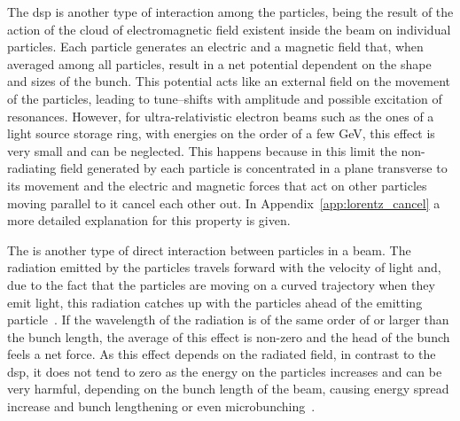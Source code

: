     The \gls{dsp} is another type of interaction among the particles, being the result of the action of the cloud of electromagnetic field existent inside the beam on individual particles. Each particle generates an electric and a magnetic field that, when averaged among all particles, result in a net potential dependent on the shape and sizes of the bunch. This potential acts like an external field on the movement of the particles, leading to tune--shifts with amplitude and possible excitation of resonances. However, for ultra-relativistic electron beams such as the ones of a light source storage ring, with energies on the order of a few \si{\giga\electronvolt}, this effect is very small and can be neglected. This happens because in this limit the non-radiating field generated by each particle is concentrated in a plane transverse to its movement and the electric and magnetic forces that act on other particles moving parallel to it cancel each other out. In Appendix~\ref{app:lorentz_cancel} a more detailed explanation for this property is given.

    The  is another type of direct interaction between particles in a beam. The radiation emitted by the particles travels forward with the velocity of light and, due to the fact that the particles are moving on a curved trajectory when they emit light, this radiation catches up with the particles ahead of the emitting particle~\cite{Derbenev1995}. If the wavelength of the radiation is of the same order of or larger than the bunch length, the average of this effect is non-zero and the head of the bunch feels a net force. As this effect depends on the radiated field, in contrast to the \gls{dsp}, it does not tend to zero as the energy on the particles increases and can be very harmful, depending on the bunch length of the beam, causing energy spread increase and bunch lengthening or even microbunching~\cite{Byrd2002}.

